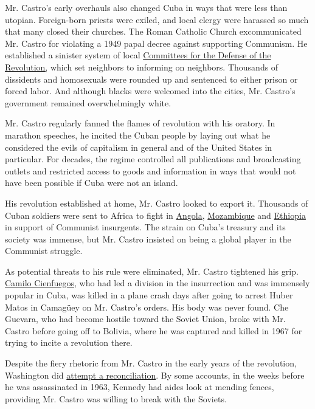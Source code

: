 Mr. Castro's early overhauls also changed Cuba in ways that were less
than utopian. Foreign-born priests were exiled, and local clergy were
harassed so much that many closed their churches. The Roman Catholic
Church excommunicated Mr. Castro for violating a 1949 papal decree
against supporting Communism. He established a sinister system of local
\href{http://query.nytimes.com/gst/abstract.html?res=9E06E6DC1F38E73ABC4A52DFB667838E669EDE}{Committees
for the Defense of the Revolution,} which set neighbors to informing on
neighbors. Thousands of dissidents and homosexuals were rounded up and
sentenced to either prison or forced labor. And although blacks were
welcomed into the cities, Mr. Castro's government remained
overwhelmingly white.

Mr. Castro regularly fanned the flames of revolution with his oratory.
In marathon speeches, he incited the Cuban people by laying out what he
considered the evils of capitalism in general and of the United States
in particular. For decades, the regime controlled all publications and
broadcasting outlets and restricted access to goods and information in
ways that would not have been possible if Cuba were not an island.

His revolution established at home, Mr. Castro looked to export it.
Thousands of Cuban soldiers were sent to Africa to fight in
\href{http://query.nytimes.com/gst/abstract.html?res=9507E4DD1E3AEF33A25755C1A9679C946790D6CF}{Angola},
\href{http://query.nytimes.com/gst/abstract.html?res=9507E4DD1E3AEF33A25755C1A9679C946790D6CF}{Mozambique}
and
\href{http://query.nytimes.com/gst/abstract.html?res=9400E6DA1530E632A25756C2A9649C946990D6CF}{Ethiopia}
in support of Communist insurgents. The strain on Cuba's treasury and
its society was immense, but Mr. Castro insisted on being a global
player in the Communist struggle.

As potential threats to his rule were eliminated, Mr. Castro tightened
his grip.
\href{http://query.nytimes.com/mem/archive/pdf?res=9F0CE1DE1531EE3BBC4953DFB7678382649EDE}{Camilo
Cienfuegos}, who had led a division in the insurrection and was
immensely popular in Cuba, was killed in a plane crash days after going
to arrest Huber Matos in Camagüey on Mr. Castro's orders. His body was
never found. Che Guevara, who had become hostile toward the Soviet
Union, broke with Mr. Castro before going off to Bolivia, where he was
captured and killed in 1967 for trying to incite a revolution there.

Despite the fiery rhetoric from Mr. Castro in the early years of the
revolution, Washington did
\href{http://www.nytimes.com/2014/12/18/upshot/when-jfk-secretly-reached-out-to-castro.html}{attempt
a reconciliation}. By some accounts, in the weeks before he was
assassinated in 1963, Kennedy had aides look at mending fences,
providing Mr. Castro was willing to break with the Soviets.

